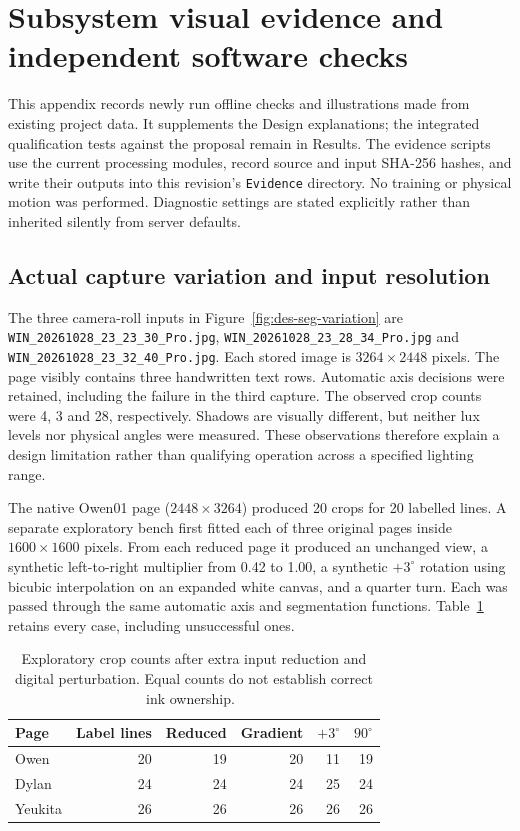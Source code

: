 \section{Subsystem visual evidence and independent software checks}
\label{app:des-visual-tests}
This appendix records newly run offline checks and illustrations made from existing project data. It supplements the Design explanations; the integrated qualification tests against the proposal remain in Results. The evidence scripts use the current processing modules, record source and input SHA-256 hashes, and write their outputs into this revision's \texttt{Evidence} directory. No training or physical motion was performed. Diagnostic settings are stated explicitly rather than inherited silently from server defaults.~\cite[subsystem manifests]{brauneevidence2026}


\subsection{Actual capture variation and input resolution}
The three camera-roll inputs in Figure~\ref{fig:des-seg-variation} are \texttt{WIN\_20261028\_23\_23\_30\_Pro.jpg}, \texttt{WIN\_20261028\_23\_28\_34\_Pro.jpg} and \texttt{WIN\_20261028\_23\_32\_40\_Pro.jpg}. Each stored image is $3264\times2448$ pixels. The page visibly contains three handwritten text rows. Automatic axis decisions were retained, including the failure in the third capture. The observed crop counts were 4, 3 and 28, respectively. Shadows are visually different, but neither lux levels nor physical angles were measured. These observations therefore explain a design limitation rather than qualifying operation across a specified lighting range.~\cite[subsystem manifests]{brauneevidence2026}


The native Owen01 page ($2448\times3264$) produced 20 crops for 20 labelled lines. A separate exploratory bench first fitted each of three original pages inside $1600\times1600$ pixels. From each reduced page it produced an unchanged view, a synthetic left-to-right multiplier from 0.42 to 1.00, a synthetic $+3^\circ$ rotation using bicubic interpolation on an expanded white canvas, and a quarter turn. Each was passed through the same automatic axis and segmentation functions. Table~\ref{tab:des-resample-cases} retains every case, including unsuccessful ones.~\cite[subsystem manifests]{brauneevidence2026}


\begin{table}[!htbp]\centering\small
\begin{tabular}{lrrrrr}\hline
Page & Label lines & Reduced & Gradient & $+3^\circ$ & $90^\circ$ \\\hline
Owen & 20 & 19 & 20 & 11 & 19 \\
Dylan & 24 & 24 & 24 & 25 & 24 \\
Yeukita & 26 & 26 & 26 & 26 & 26 \\
\hline\end{tabular}
\caption{Exploratory crop counts after extra input reduction and digital perturbation. Equal counts do not establish correct ink ownership.~\cite{brauneevidence2026,braunepipeline2026}}
\label{tab:des-resample-cases}
\end{table}

